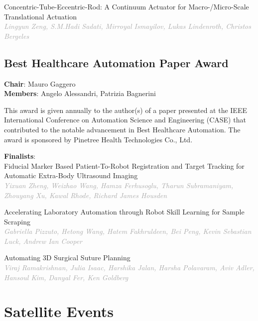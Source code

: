 \documentclass[
	openany, %
	parskip=full, %
	12pt, %
	a4paper, %
]{conferencebooklet} %
\begin{document}
\begin{multicols*}{2}
\small Concentric-Tube-Eccentric-Rod: A Continuum Actuator for Macro-/Micro-Scale Translational Actuation \\
\footnotesize \textit{\textcolor{darkgray}{Lingyun Zeng, S.M.Hadi Sadati, Mirroyal Ismayilov, Lukas Lindenroth, Christos Bergeles}}

\normalsize

\section{Best Healthcare Automation Paper Award}
\textbf{Chair}: Mauro Gaggero \\
\textbf{Members}: Angelo Alessandri, Patrizia Bagnerini 

This award is given annually to the author(s) of a paper presented at the IEEE International Conference on Automation Science and Engineering (CASE) that contributed to the notable advancement in Best Healthcare Automation. 
The award is sponsored by Pinetree Health Technologies Co., Ltd.

\textbf{Finalists}: \\
\small Fiducial Marker Based Patient-To-Robot Registration and Target Tracking for Automatic Extra-Body Ultrasound Imaging \\
\footnotesize \textit{\textcolor{darkgray}{Yixuan Zheng, Weizhao Wang, Hamza Ferhusoglu, Tharun Subramaniyam, Zhouyang Xu, Kawal Rhode, Richard James Housden}} 

\small  Accelerating Laboratory Automation through Robot Skill Learning for Sample Scraping \\
\footnotesize \textit{\textcolor{darkgray}{Gabriella Pizzuto, Hetong Wang, Hatem Fakhruldeen, Bei Peng, Kevin Sebastian Luck, Andrew Ian Cooper}} 

\small  Automating 3D Surgical Suture Planning \\
\footnotesize \textit{\textcolor{darkgray}{Viraj Ramakrishnan, Julia Isaac, Harshika Jalan, Harsha Polavaram, Aviv Adler, Hansoul Kim, Danyal Fer, Ken Goldberg}}

\end{multicols*}


\chapter{Satellite Events}
\end{document}
